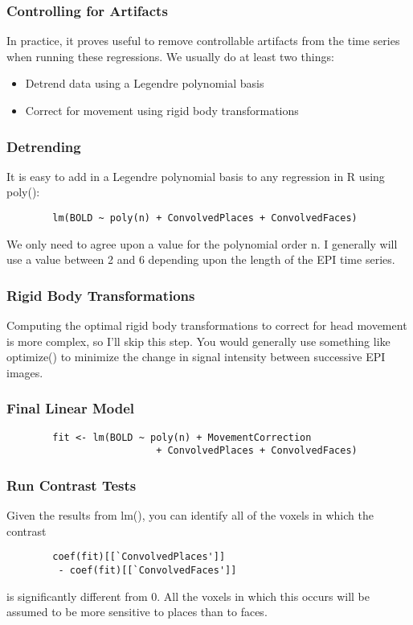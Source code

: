 \documentclass{beamer}
\begin{document}
\begin{frame}[fragile]
	\frametitle{Controlling for Artifacts}
  
	In practice, it proves useful to remove controllable artifacts from the time series when running these regressions. We usually do at least two things:
  
	 \begin{itemize}
	  	\item{Detrend data using a Legendre polynomial basis}
		\item{Correct for movement using rigid body transformations}
	\end{itemize}
\end{frame}

\begin{frame}[fragile]
	\frametitle{Detrending}
  
  	It is easy to add in a Legendre polynomial basis to any regression in R using poly():
	
	\begin{verbatim}
		lm(BOLD ~ poly(n) + ConvolvedPlaces + ConvolvedFaces)
	\end{verbatim}
  
  	We only need to agree upon a value for the polynomial order n. I generally will use a value between 2 and 6 depending upon the length of the EPI time series.
\end{frame}

\frame
{
	\frametitle{Rigid Body Transformations}
	
	Computing the optimal rigid body transformations to correct for head movement is more complex, so I'll skip this step. You would generally use something like optimize() to minimize the change in signal intensity between successive EPI images.
}

\begin{frame}[fragile]
	\frametitle{Final Linear Model}
	
  	\begin{verbatim}
		fit <- lm(BOLD ~ poly(n) + MovementCorrection
		                  + ConvolvedPlaces + ConvolvedFaces)
	\end{verbatim}
\end{frame}

\begin{frame}[fragile]
	\frametitle{Run Contrast Tests}
	
	Given the results from lm(), you can identify all of the voxels in which the contrast
	
	\begin{verbatim}
		coef(fit)[[`ConvolvedPlaces']]
		 - coef(fit)[[`ConvolvedFaces']]
	\end{verbatim}
	
	is significantly different from 0. All the voxels in which this occurs will be assumed to be more sensitive to places than to faces.
\end{frame}
\end{document}
